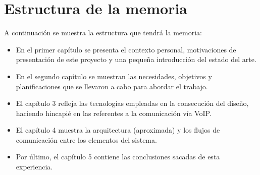 \documentclass[a4paper, 12pt]{book}
\begin{document}
\section{Estructura de la memoria}

A continuación se muestra la estructura que tendrá la memoria:
\begin{itemize}
  \item En el primer capítulo se presenta el contexto personal, motivaciones de presentación de este proyecto y una pequeña introducción del estado del arte.
  
  \item  En el segundo capítulo se muestran las necesidades, objetivos y planificaciones que se llevaron a cabo para abordar el trabajo.  

  \item El capítulo 3 refleja las tecnologías empleadas en la consecución del diseño, haciendo hincapié en las referentes a la comunicación vía VoIP.
  
  \item El capítulo 4 muestra la arquitectura (aproximada) y los flujos de comunicación entre los elementos del sistema.  

  \item Por último, el capítulo 5 contiene las conclusiones sacadas de esta experiencia.
\end{itemize}




\end{document}
